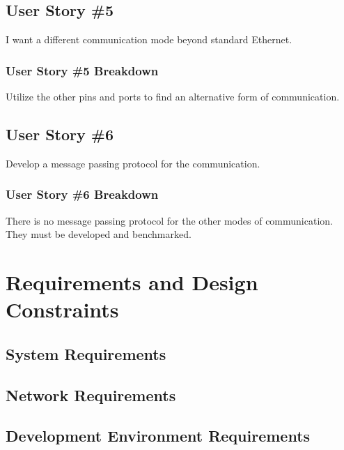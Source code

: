 \subsection{User Story \#5} 
I want a different communication mode beyond standard Ethernet.
\subsubsection{User Story \#5 Breakdown}
Utilize the other pins and ports to find an alternative form of communication.

\subsection{User Story \#6} 
Develop a message passing protocol for the communication.
\subsubsection{User Story \#6 Breakdown}
There is no message passing protocol for the other modes of communication. They must be developed and benchmarked.

\section{Requirements and Design Constraints}


\subsection{System  Requirements}


\subsection{Network Requirements}


\subsection{Development Environment Requirements}

